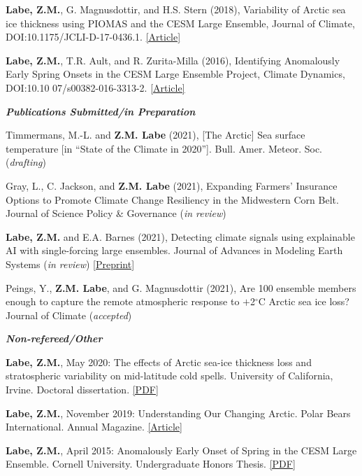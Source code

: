 \documentclass[margin,line,palatino,courier,10pt]{res}
\begin{document}
\begin{resume}
\begin{etaremune}[leftmargin=0in,topsep=0in,parsep=0in]
\item \textbf{Labe, Z.M.}, G. Magnusdottir, and H.S. Stern (2018), Variability of Arctic sea ice thickness using PIOMAS and the CESM Large Ensemble, Journal of Climate, DOI:10.1175/JCLI-D-17-0436.1. \href{https://journals.ametsoc.org/doi/abs/10.1175/JCLI-D-17-0436.1}{[Article]}
\item \textbf{Labe, Z.M.}, T.R. Ault, and R. Zurita-Milla (2016), Identifying Anomalously Early Spring Onsets in the CESM Large Ensemble Project, Climate Dynamics, DOI:10.10 07/s00382-016-3313-2. \href{http://link.springer.com/article/10.1007/s00382-016-3313-2}{[Article]}
\end{etaremune}

\textit{\textbf{Publications Submitted/in Preparation}}
\vspace*{-0.1in}\\
\begin{etaremune}[leftmargin=0in,topsep=0in,parsep=0in]
\item Timmermans, M.-L. and \textbf{Z.M. Labe} (2021), [The Arctic] Sea surface temperature [in ``State of the Climate in 2020'']. Bull. Amer. Meteor. Soc. (\textit{drafting})
\item Gray, L., C. Jackson, and \textbf{Z.M. Labe} (2021), Expanding Farmers' Insurance Options to Promote Climate Change Resiliency in the Midwestern Corn Belt. Journal of Science Policy \& Governance (\textit{in review})
\item \textbf{Labe, Z.M.} and E.A. Barnes (2021), Detecting climate signals using explainable AI with single-forcing large ensembles. Journal of Advances in Modeling Earth Systems (\textit{in review}) \href{https://www.essoar.org/doi/10.1002/essoar.10505762.1}{[Preprint]}
\item Peings, Y., \textbf{Z.M. Labe}, and G. Magnusdottir (2021), Are 100 ensemble members enough to capture the remote atmospheric response to $+$2$^{\circ}$C Arctic sea ice loss? Journal of Climate (\textit{accepted})
\end{etaremune}

\textit{\textbf{Non-refereed/Other}}
\vspace*{-0.1in}\\
\begin{etaremune}[leftmargin=0in,topsep=0in,parsep=0in]
\item \textbf{Labe, Z.M.}, May 2020: The effects of Arctic sea-ice thickness loss and stratospheric variability on mid-latitude cold spells. University of California, Irvine. Doctoral dissertation. \href{https://escholarship.org/uc/item/778982rr}{[PDF]}
\item \textbf{Labe, Z.M.}, November 2019: Understanding Our Changing Arctic. Polar Bears International. Annual Magazine. \href{https://polarbearsinternational.org/media/3480/pbi_2019_newsmag_web.pdf}{[Article]}
\item \textbf{Labe, Z.M.}, April 2015: Anomalously Early Onset of Spring in the CESM Large Ensemble. Cornell University. Undergraduate Honors Thesis. \href{http://sites.uci.edu/zlabe/files/2015/11/Labe_Thesis2015.pdf}{[PDF]}
\end{etaremune}


\end{resume}
\end{document}
